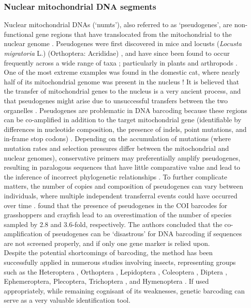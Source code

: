 \subsubsection{Nuclear mitochondrial DNA segments}
Nuclear mitochondrial DNAs (`numts'), also referred to as `pseudogenes', are non-functional gene regions that have translocated from the mitochondrial to the nuclear genome \citep{DErrico2004, Frezal2008, Hazkani-Covo2010, Leite2012}. Pseudogenes were first discovered in mice \citep{DuBuy1967} and locusts (\textit{Locusta migratoria} L.) (Orthoptera: Acrididae) \citep{Gellissen1983}, and have since been found to occur frequently across a wide range of taxa \citep{Lopez1994, Zhang1996, Williams2001, Richly2004, Pamilo2007}; particularly in plants and arthropods \citep{Gellissen1983, Bensasson2000, Bensasson2001, Buhay2009}. One of the most extreme examples was found in the domestic cat, where nearly half of its mitochondrial genome was present in the nucleus \citep{Lopez1994}! It is believed that the transfer of mitochondrial genes to the nucleus is a very ancient process, and that pseudogenes might arise due to unsuccessful transfers between the two organelles \citep{DErrico2004}. 
Pseudogenes are problematic in DNA barcoding because these regions can be co-amplified in addition to the target mitochondrial gene (identifiable by differences in nucleotide composition, the presence of indels, point mutations, and in-frame stop codons) \citep{Bensasson2001, Song2008, Moulton2010, Ahmed2015}. Depending on the accumulation of mutations (where mutation rates and selection pressures differ between the mitochondrial and nuclear genomes), conservative primers may preferentially amplify pseudogenes, resulting in paralogous sequences that have little comparative value and lead to the inference of incorrect phylogenetic relationships \citep{Bensasson2001, Song2008, Moulton2010, Leite2012}. To further complicate matters, the number of copies and composition of pseudogenes can vary between individuals, where multiple independent transferral events could have occurred over time \citep{Bensasson2000,Bensasson2001}. \citet{Song2008} found that the presence of pseudogenes in the COI barcodes for grasshoppers and crayfish lead to an overestimation of the number of species sampled by 2.8 and 3.6-fold, respectively. The authors concluded that the co-amplification of pseudogenes can be `disastrous' for DNA barcoding if sequences are not screened properly, and if only one gene marker is relied upon. \\
Despite the potential shortcomings of barcoding, the method has been successfully applied in numerous studies involving insects, representing groups such as the Heteroptera \citep{Raupach2014, Havemann2018}, Orthoptera \citep{Hawlitschek2017}, Lepidoptera \citep{Hausmann2013GeneticSystem, Razowski2017UncoveringTortricidae, Spitsyn2018DNAPleistocene}, Coleoptera \citep{Raupach2010, Hendrich2015ABOLD}, Diptera \citep{Lin2015ExploringBarcodes}, Ephemeroptera, Plecoptera, Trichoptera \citep{Cordero2017DNACanada,Cukusic2017DNACroatia}, and Hymenoptera \citep{Schmidt2017IdentificationCaveats}. If used appropriately, while remaining cognisant of its weaknesses, genetic barcoding can serve as a very valuable identification tool.